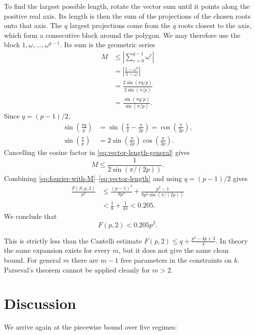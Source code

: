 \documentclass{article}
\begin{document}
To find the largest possible length, rotate the vector sum until it points
along the positive real axis. Its length is then the sum of the projections
of the chosen roots onto that axis. The $q$ largest projections come from
the $q$ roots closest to the axis, which form a consecutive block around the
polygon. We may therefore use the block
$1,\omega,\ldots,\omega^{q-1}$. Its sum is the geometric series
\begin{align}
M
&\leq \left|\sum_{r=0}^{q-1}\omega^r\right| \\
&=\left|\frac{1-\omega^q}{1-\omega}\right| \\
&=\frac{2\sin(\pi q/p)}{2\sin(\pi/p)} \\
&=\frac{\sin(\pi q/p)}{\sin(\pi/p)}.
\label{eq:vector-length-general}
\end{align}
Since $q=(p-1)/2$,
\begin{align}
\sin\left(\frac{\pi q}{p}\right)
&=\sin\left(\frac{\pi}{2}-\frac{\pi}{2p}\right)
=\cos\left(\frac{\pi}{2p}\right), \\
\sin\left(\frac{\pi}{p}\right)
&=2\sin\left(\frac{\pi}{2p}\right)
\cos\left(\frac{\pi}{2p}\right).
\end{align}
Cancelling the cosine factor in \eqref{eq:vector-length-general} gives
\begin{equation}
M\leq\frac{1}{2\sin(\pi/(2p))}.
\label{eq:vector-length}
\end{equation}
Combining \eqref{eq:fourier-with-M}--\eqref{eq:vector-length} and using
$q=(p-1)/2$ gives
\begin{align}
\frac{F(S,p,2)}{p^2}
&\leq
\frac{(p-1)^3}{8p^3}
+\frac{p^2-1}{8p^3\sin(\pi/(2p))} \\
&<\frac18+\frac{1}{4\pi}
<0.205.
\label{eq:fourier-final}
\end{align}
We conclude that
\begin{equation}
\boxed{F(p,2)<0.205p^2.}
\end{equation}

This is strictly less than the Cantelli estimate $F(p,2) \leq q + \frac{p^2 - 4p + 3}{4}$. In theory the same expansion exists for every $m$, but it does not give the same clean
bound. For general $m$ there are $m-1$ free parameters in the constraints on $k$. Parseval's theorem cannot be applied cleanly for $m>2$.

\section{Discussion}
We arrive again at the piecewise bound over five regimes:
\end{document}
